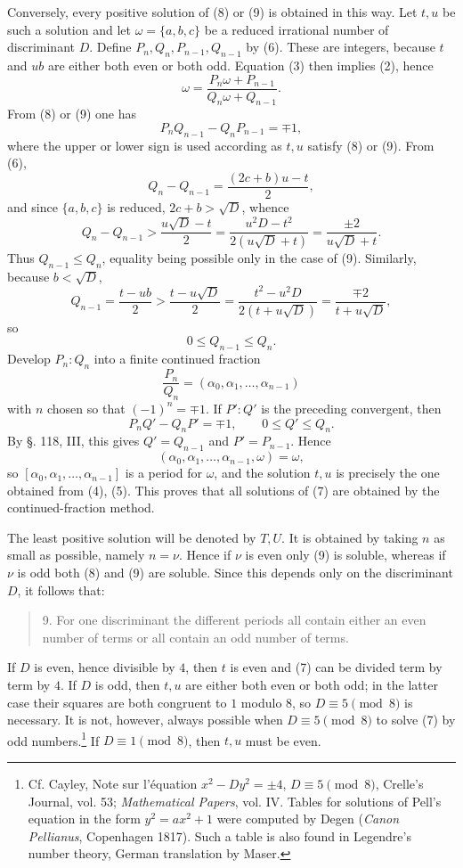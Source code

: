 \documentclass[11pt]{article}
\begin{document}
Conversely, every positive solution of (8) or (9) is obtained in this way. Let $t,u$ be such a solution and let $\omega=\{a,b,c\}$ be a reduced irrational number of discriminant $D$. Define $P_n,Q_n,P_{n-1},Q_{n-1}$ by (6). These are integers, because $t$ and $ub$ are either both even or both odd. Equation (3) then implies (2), hence
\[
\tag{10}       \omega=\frac{P_n\omega+P_{n-1}}{Q_n\omega+Q_{n-1}}.
\]
From (8) or (9) one has
\[
\tag{11}       P_nQ_{n-1}-Q_nP_{n-1}=\mp1,
\]
where the upper or lower sign is used according as $t,u$ satisfy (8) or (9). From (6),
\[
        Q_n-Q_{n-1}=\frac{(2c+b)u-t}{2},
\]
and since $\{a,b,c\}$ is reduced, $2c+b>\sqrt D$, whence
\[
        Q_n-Q_{n-1}>
\frac{u\sqrt D-t}{2}
=\frac{u^2D-t^2}{2(u\sqrt D+t)}
=\frac{\pm2}{u\sqrt D+t}.
\]
Thus $Q_{n-1}\le Q_n$, equality being possible only in the case of (9). Similarly, because $b<\sqrt D$,
\[
        Q_{n-1}=\frac{t-ub}{2}>
\frac{t-u\sqrt D}{2}
=\frac{t^2-u^2D}{2(t+u\sqrt D)}
=\frac{\mp2}{t+u\sqrt D},
\]
so
\[
\tag{12}       0\le Q_{n-1}\le Q_n.
\]
Develop $P_n:Q_n$ into a finite continued fraction
\[
        \frac{P_n}{Q_n}=(\alpha_0,\alpha_1,\ldots,\alpha_{n-1})
\]
with $n$ chosen so that $(-1)^n=\mp1$. If $P':Q'$ is the preceding convergent, then
\[
        P_nQ'-Q_nP'=\mp1,\qquad 0\le Q'\le Q_n.
\]
By §. 118, III, this gives $Q'=Q_{n-1}$ and $P'=P_{n-1}$. Hence
\[
        (\alpha_0,\alpha_1,\ldots,\alpha_{n-1},\omega)=\omega,
\]
so $[\alpha_0,\alpha_1,\ldots,\alpha_{n-1}]$ is a period for $\omega$, and the solution $t,u$ is precisely the one obtained from (4), (5). This proves that all solutions of (7) are obtained by the continued-fraction method.

The least positive solution will be denoted by $T,U$. It is obtained by taking $n$ as small as possible, namely $n=\nu$. Hence if $\nu$ is even only (9) is soluble, whereas if $\nu$ is odd both (8) and (9) are soluble. Since this depends only on the discriminant $D$, it follows that:
\begin{quote}
9. For one discriminant the different periods all contain either an even number of terms or all contain an odd number of terms.
\end{quote}

If $D$ is even, hence divisible by $4$, then $t$ is even and (7) can be divided term by term by $4$. If $D$ is odd, then $t,u$ are either both even or both odd; in the latter case their squares are both congruent to $1$ modulo $8$, so $D\equiv5\pmod8$ is necessary. It is not, however, always possible when $D\equiv5\pmod8$ to solve (7) by odd numbers.\footnote{Cf. Cayley, Note sur l'équation $x^2-Dy^2=\pm4$, $D\equiv5\pmod8$, Crelle's Journal, vol. 53; \emph{Mathematical Papers}, vol. IV. Tables for solutions of Pell's equation in the form $y^2=ax^2+1$ were computed by Degen (\emph{Canon Pellianus}, Copenhagen 1817). Such a table is also found in Legendre's number theory, German translation by Maser.} If $D\equiv1\pmod8$, then $t,u$ must be even.
\end{document}
